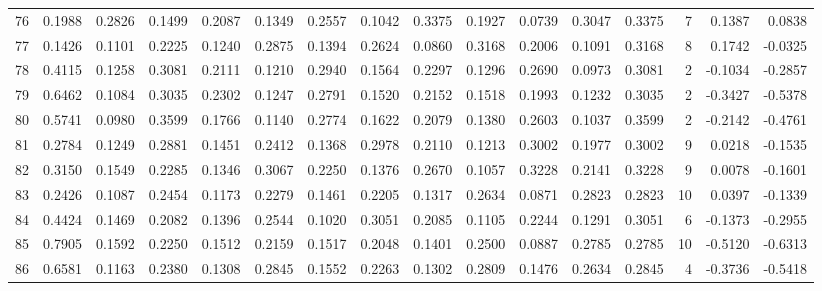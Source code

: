 \begin{tabular}{lrrrrrrrrrrrrrrr}
76  &      0.1988 &  0.2826 &  0.1499 &  0.2087 &  0.1349 &  0.2557 &  0.1042 &  0.3375 &  0.1927 &  0.0739 &   0.3047 &     0.3375 &      7 &                    0.1387 &                     0.0838 \\
77  &      0.1426 &  0.1101 &  0.2225 &  0.1240 &  0.2875 &  0.1394 &  0.2624 &  0.0860 &  0.3168 &  0.2006 &   0.1091 &     0.3168 &      8 &                    0.1742 &                    -0.0325 \\
78  &      0.4115 &  0.1258 &  0.3081 &  0.2111 &  0.1210 &  0.2940 &  0.1564 &  0.2297 &  0.1296 &  0.2690 &   0.0973 &     0.3081 &      2 &                   -0.1034 &                    -0.2857 \\
79  &      0.6462 &  0.1084 &  0.3035 &  0.2302 &  0.1247 &  0.2791 &  0.1520 &  0.2152 &  0.1518 &  0.1993 &   0.1232 &     0.3035 &      2 &                   -0.3427 &                    -0.5378 \\
80  &      0.5741 &  0.0980 &  0.3599 &  0.1766 &  0.1140 &  0.2774 &  0.1622 &  0.2079 &  0.1380 &  0.2603 &   0.1037 &     0.3599 &      2 &                   -0.2142 &                    -0.4761 \\
81  &      0.2784 &  0.1249 &  0.2881 &  0.1451 &  0.2412 &  0.1368 &  0.2978 &  0.2110 &  0.1213 &  0.3002 &   0.1977 &     0.3002 &      9 &                    0.0218 &                    -0.1535 \\
82  &      0.3150 &  0.1549 &  0.2285 &  0.1346 &  0.3067 &  0.2250 &  0.1376 &  0.2670 &  0.1057 &  0.3228 &   0.2141 &     0.3228 &      9 &                    0.0078 &                    -0.1601 \\
83  &      0.2426 &  0.1087 &  0.2454 &  0.1173 &  0.2279 &  0.1461 &  0.2205 &  0.1317 &  0.2634 &  0.0871 &   0.2823 &     0.2823 &     10 &                    0.0397 &                    -0.1339 \\
84  &      0.4424 &  0.1469 &  0.2082 &  0.1396 &  0.2544 &  0.1020 &  0.3051 &  0.2085 &  0.1105 &  0.2244 &   0.1291 &     0.3051 &      6 &                   -0.1373 &                    -0.2955 \\
85  &      0.7905 &  0.1592 &  0.2250 &  0.1512 &  0.2159 &  0.1517 &  0.2048 &  0.1401 &  0.2500 &  0.0887 &   0.2785 &     0.2785 &     10 &                   -0.5120 &                    -0.6313 \\
86  &      0.6581 &  0.1163 &  0.2380 &  0.1308 &  0.2845 &  0.1552 &  0.2263 &  0.1302 &  0.2809 &  0.1476 &   0.2634 &     0.2845 &      4 &                   -0.3736 &                    -0.5418 \\

\end{tabular}
